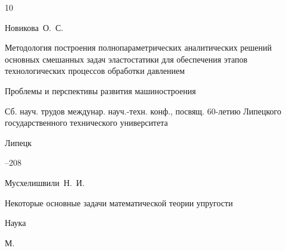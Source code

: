 \begin{thebibliography}{10}




\by Новикова~О.~С.

\paper Методология построения полнопараметрических аналитических решений основных смешанных задач эластостатики для обеспечения этапов технологических процессов обработки давлением

\inbook Проблемы и перспективы развития машиностроения

\bookinfo Сб. науч. трудов междунар. науч.-техн. конф., посвящ. 60-летию Липецкого государственного технического университета



\publaddr Липецк

--208















\by Мусхелишвили~Н.~И.

\book Некоторые основные задачи математической теории упругости


\publ Наука

\publaddr М.







\end{thebibliography}
